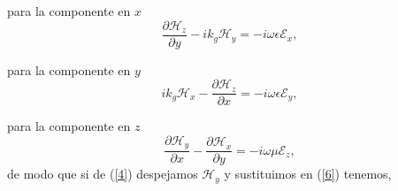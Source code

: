 \documentclass[11pt,fleqn]{book} %
\begin{document}
  para la componente en $x$
   \begin{equation} \label{6}
  \frac{\partial \mathcal{H}_z }{\partial y}-ik_g\mathcal{H}_y=-i\omega\epsilon \mathcal{E}_{x},
  \end{equation}

  para la componente en $y$
   \begin{equation} \label{7}
  ik_g\mathcal{H}_x-\frac{\partial \mathcal{H}_z }{\partial x}=-i\omega\epsilon \mathcal{E}_{y},
  \end{equation}

para la componente en $z$
   \begin{equation} \label{8}
  \frac{\partial \mathcal{H}_y }{\partial x}-\frac{\partial \mathcal{H}_x }{\partial y}=-i\omega\mu \mathcal{E}_{z},
   \end{equation}
  de modo que si de (\ref{4}) despejamos $\mathcal{H}_y$ y sustituimos en (\ref{6}) tenemos,
\end{document}
